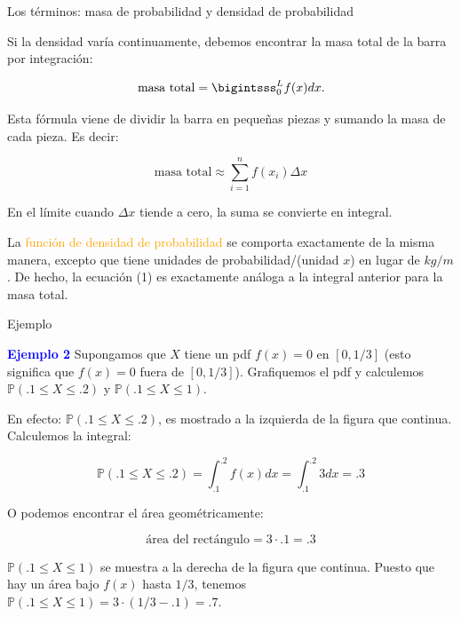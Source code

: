 \documentclass[10pt]{beamer}
\begin{document}
\begin{frame}{Los t\'erminos: masa de probabilidad y densidad de probabilidad}
\small{ Si la densidad var\'ia continuamente, debemos encontrar la masa total de la barra por integraci\'on:
	
\[
\text{masa total} = \bigintsss_{0}^{L}f(x)dx.
\]

Esta f\'ormula viene de dividir la barra en peque\~nas piezas y sumando  la masa de cada pieza. Es decir:

\[
\text{masa total} \approx \sum_{i =1}^{n}f(x_i)\Delta x
\]


En el l\'imite cuando $\Delta x$ tiende  a cero, la suma se convierte en integral.

La \textcolor{orange}{funci\'on de densidad de probabilidad} se comporta exactamente de la misma manera, excepto que tiene unidades de probabilidad/(unidad $x$) en lugar de $kg/ m$. De hecho, la ecuaci\'on (1) es exactamente an\'aloga a la integral anterior para la masa total.
		
}
\end{frame}

\begin{frame}{Ejemplo}
\small{
\textcolor{blue}{\textbf {Ejemplo 2}} Supongamos que $X$ tiene un pdf $f(x) = 0$ en $[0, 1/3]$ (esto significa que $f(x) = 0$ fuera de $[0, 1/3]$). Grafiquemos el pdf y calculemos $\mathbb{P}(.1 \leq X \leq .2)$ y $\mathbb{P}(.1 \leq X \leq 1)$. 

En efecto:  $\mathbb{P}(.1 \leq X \leq .2)$, es mostrado a la izquierda de la figura que continua. Calculemos la integral:

\[
\mathbb{P}(.1 \leq X \leq .2) = \int_{.1}^{.2}f(x) dx = \int_{.1}^{.2}3dx = .3
\]

O podemos encontrar el \'area geom\'etricamente:

\[
\text{\'area del rect\'angulo} = 3 \cdot .1 = .3
\]

$\mathbb{P}(.1 \leq  X \leq  1)$ se muestra a la derecha de la figura que continua. Puesto que hay un \'area bajo $f(x)$ hasta $1/3$, tenemos $\mathbb{P}(.1 \leq X \leq 1) = 3 \cdot (1/3 - .1) = .7$.
}
\end{frame}
\end{document}
